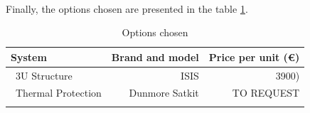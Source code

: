 \paragraph{}Finally, the options chosen are presented in the table \ref{structurefinal}.

\begin{longtable}{| l | r | r | }
\hline
\rowcolor[gray]{0.80}	\textbf{System} &  \textbf{Brand and model}     & \textbf{Price per unit (\euro)}   \\
\hline
\endfirsthead

	   ~3U Structure & ISIS & 3900) \\
	   \hline
	   ~Thermal Protection & Dunmore Satkit & TO REQUEST \\
	\hline

\caption{Options chosen}
\label{structurefinal}
\end{longtable}

